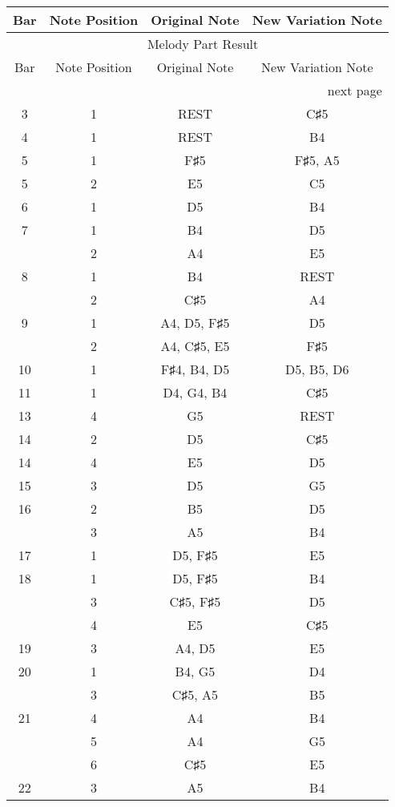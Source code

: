\documentclass{article}
\begin{document}
\begin{longtable}{|c|c|c|c|}
\hline
Bar & Note Position & Original Note & New Variation Note \\ \hline
\endfirsthead
\multicolumn{4}{c}{{\tablename\ \thetable{} Melody Part Result}} \\
\hline
Bar & Note Position & Original Note & New Variation Note \\ \hline
\hline
\endhead
\hline
\multicolumn{4}{r}{next page}
\endfoot
\hline
\endlastfoot
1 & 1 & REST & F♯5 \\ 
\hline
3 & 1 & REST & C♯5 \\ 
\hline
4 & 1 & REST & B4 \\ 
\hline
5 & 1 & F♯5 & F♯5, A5 \\ 
\hline
5 & 2 & E5 & C5 \\ 
\hline
6 & 1 & D5 & B4 \\ 
\hline
7 & 1 & B4 & D5 \\ 
  & 2 & A4 & E5 \\ 
\hline
8 & 1 & B4 & REST \\ 
  & 2 & C♯5 & A4 \\ 
\hline
9 & 1 & A4, D5, F♯5 & D5 \\ 
  & 2 & A4, C♯5, E5 & F♯5 \\ 
\hline
10 & 1 & F♯4, B4, D5 & D5, B5, D6 \\ 
\hline
11 & 1 & D4, G4, B4 & C♯5 \\ 
\hline
13 & 4 & G5 & REST \\ 
\hline
14 & 2 & D5 & C♯5 \\ 
\hline
14 & 4 & E5 & D5 \\ 
\hline
15 & 3 & D5 & G5 \\ 
\hline
16 & 2 & B5 & D5 \\ 
  & 3 & A5 & B4 \\ 
\hline
17 & 1 & D5, F♯5 & E5 \\ 
\hline
18 & 1 & D5, F♯5 & B4 \\ 
  & 3 & C♯5, F♯5 & D5 \\ 
  & 4 & E5 & C♯5 \\ 
\hline
19 & 3 & A4, D5 & E5 \\ 
\hline
20 & 1 & B4, G5 & D4 \\ 
  & 3 & C♯5, A5 & B5 \\ 
\hline
21 & 4 & A4 & B4 \\ 
  & 5 & A4 & G5 \\ 
  & 6 & C♯5 & E5 \\ 
\hline
22 & 3 & A5 & B4 \\ 

\end{longtable}
\end{document}
